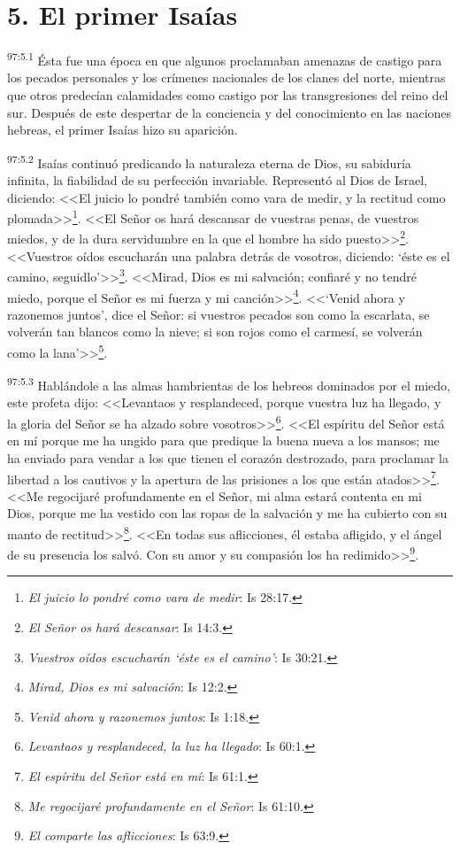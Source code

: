 \section*{5. El primer Isaías}
\par
\textsuperscript{97:5.1} Ésta fue una época en que algunos proclamaban amenazas de castigo para los pecados personales y los crímenes nacionales de los clanes del norte, mientras que otros predecían calamidades como castigo por las transgresiones del reino del sur. Después de este despertar de la conciencia y del conocimiento en las naciones hebreas, el primer Isaías hizo su aparición.

\par
\textsuperscript{97:5.2} Isaías continuó predicando la naturaleza eterna de Dios, su sabiduría infinita, la fiabilidad de su perfección invariable. Representó al Dios de Israel, diciendo: <<El juicio lo pondré también como vara de medir, y la rectitud como plomada>>\footnote{\textit{El juicio lo pondré como vara de medir}: Is 28:17.}. <<El Señor os hará descansar de vuestras penas, de vuestros miedos, y de la dura servidumbre en la que el hombre ha sido puesto>>\footnote{\textit{El Señor os hará descansar}: Is 14:3.}. <<Vuestros oídos escucharán una palabra detrás de vosotros, diciendo: `éste es el camino, seguidlo'>>\footnote{\textit{Vuestros oídos escucharán `éste es el camino'}: Is 30:21.}. <<Mirad, Dios es mi salvación; confiaré y no tendré miedo, porque el Señor es mi fuerza y mi canción>>\footnote{\textit{Mirad, Dios es mi salvación}: Is 12:2.}. <<`Venid ahora y razonemos juntos', dice el Señor: si vuestros pecados son como la escarlata, se volverán tan blancos como la nieve; si son rojos como el carmesí, se volverán como la lana'>>\footnote{\textit{Venid ahora y razonemos juntos}: Is 1:18.}.

\par
\textsuperscript{97:5.3} Hablándole a las almas hambrientas de los hebreos dominados por el miedo, este profeta dijo: <<Levantaos y resplandeced, porque vuestra luz ha llegado, y la gloria del Señor se ha alzado sobre vosotros>>\footnote{\textit{Levantaos y resplandeced, la luz ha llegado}: Is 60:1.}. <<El espíritu del Señor está en mí porque me ha ungido para que predique la buena nueva a los mansos; me ha enviado para vendar a los que tienen el corazón destrozado, para proclamar la libertad a los cautivos y la apertura de las prisiones a los que están atados>>\footnote{\textit{El espíritu del Señor está en mí}: Is 61:1.}. <<Me regocijaré profundamente en el Señor, mi alma estará contenta en mi Dios, porque me ha vestido con las ropas de la salvación y me ha cubierto con su manto de rectitud>>\footnote{\textit{Me regocijaré profundamente en el Señor}: Is 61:10.}. <<En todas sus aflicciones, él estaba afligido, y el ángel de su presencia los salvó. Con su amor y su compasión los ha redimido>>\footnote{\textit{El comparte las aflicciones}: Is 63:9.}.

